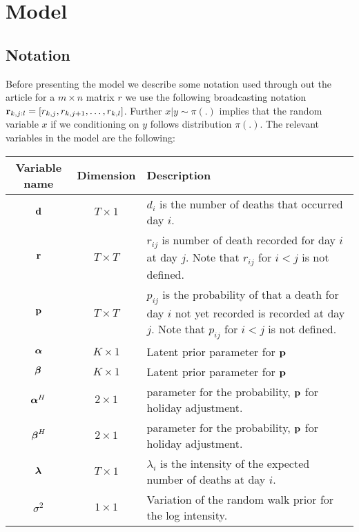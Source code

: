 
% 




\section{Model}

\subsection{Notation}
Before presenting the model we describe some notation used through out the article for a $m \times n$ matrix $r$ we use the following broadcasting notation ${\boldsymbol{\mathrm{r}}}_{k,j:l}=[ r_{k,j}, r_{k,j+1}, \ldots, r_{k,l}]$.
Further $x | y \sim \pi(.)$ implies that the random variable $x$ if we conditioning on $y$ follows distribution $\pi(.)$.
The relevant variables in the model are the following:

	\begin{tabularx}{\linewidth}{ccL}
		Variable name & Dimension & Description \\  \hline
		${\boldsymbol{\mathrm{d}}}$ & $T \times 1$ & $d_i$ is the number of deaths that occurred day $i$. \\
		${\boldsymbol{\mathrm{r}}}$ & $T \times T$ & $r_{ij}$ is number of death recorded for day $i$ at day $j$.  Note that $r_{ij}$ for $i<j$ is not defined.   \\
		${\boldsymbol{\mathrm{p}}}$ & $T \times T$ & $p_{ij}$ is the probability of that a death for day $i$ not yet recorded is recorded at day $j$.
		  Note that $p_{ij}$ for $i<j$ is not defined.  \\
		${\boldsymbol{\mathrm{\alpha}}}$ & $K \times 1$ & Latent prior parameter for ${\boldsymbol{\mathrm{p}}}$ \\
		${\boldsymbol{\mathrm{\beta}}}$ & $K \times 1$ & Latent prior parameter for ${\boldsymbol{\mathrm{p}}}$ \\
		${\boldsymbol{\mathrm{\alpha}}}^H$ & $2 \times 1$ & parameter for the probability, ${\boldsymbol{\mathrm{p}}}$ for holiday adjustment. \\
		${\boldsymbol{\mathrm{\beta}}}^H$ & $2 \times 1$ & parameter for the probability, ${\boldsymbol{\mathrm{p}}}$ for holiday adjustment. \\
		${\boldsymbol{\mathrm{\lambda}}}$ &  $T \times 1$ &  $\lambda_i$  is the intensity of the expected number of deaths at day $i$. \\
		$\sigma^2$ & $1\times 1$ & Variation of the random walk prior for the log intensity.

	\end{tabularx}
